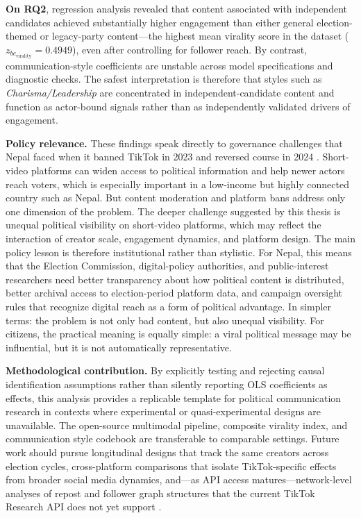 \documentclass[12pt,a4paper]{report}
\begin{document}
\textbf{On RQ2}, regression analysis revealed that content associated with independent candidates achieved substantially higher engagement than either general election-themed or legacy-party content---the highest mean virality score in the dataset ($z_{bc_{\text{virality}}} = 0.4949$), even after controlling for follower reach. By contrast, communication-style coefficients are unstable across model specifications and diagnostic checks. The safest interpretation is therefore that styles such as \textit{Charisma/Leadership} are concentrated in independent-candidate content and function as actor-bound signals rather than as independently validated drivers of engagement.

\textbf{Policy relevance.} These findings speak directly to governance challenges that Nepal faced when it banned TikTok in 2023 and reversed course in 2024 \parencite{lamichhane2024tik, reuters2024tiktok}. Short-video platforms can widen access to political information and help newer actors reach voters, which is especially important in a low-income but highly connected country such as Nepal. But content moderation and platform bans address only one dimension of the problem. The deeper challenge suggested by this thesis is unequal political visibility on short-video platforms, which may reflect the interaction of creator scale, engagement dynamics, and platform design. The main policy lesson is therefore institutional rather than stylistic. For Nepal, this means that the Election Commission, digital-policy authorities, and public-interest researchers need better transparency about how political content is distributed, better archival access to election-period platform data, and campaign oversight rules that recognize digital reach as a form of political advantage. In simpler terms: the problem is not only bad content, but also unequal visibility. For citizens, the practical meaning is equally simple: a viral political message may be influential, but it is not automatically representative.

\textbf{Methodological contribution.} By explicitly testing and rejecting causal identification assumptions rather than silently reporting OLS coefficients as effects, this analysis provides a replicable template for political communication research in contexts where experimental or quasi-experimental designs are unavailable. The open-source multimodal pipeline, composite virality index, and communication style codebook are transferable to comparable settings. Future work should pursue longitudinal designs that track the same creators across election cycles, cross-platform comparisons that isolate TikTok-specific effects from broader social media dynamics, and---as API access matures---network-level analyses of repost and follower graph structures that the current TikTok Research API does not yet support \parencite{tiktokResearchAPI2025}.
\end{document}
